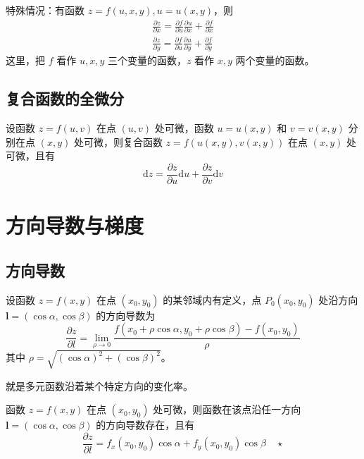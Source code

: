 特殊情况：有函数 $z=f(u,x,y), u=u(x,y)$，则
\[
    \begin{aligned}
        \frac{\partial z}{\partial x}=\frac{\partial f}{\partial u}\frac{\partial u}{\partial x}+\frac{\partial f}{\partial x} \\
        \frac{\partial z}{\partial y}=\frac{\partial f}{\partial u}\frac{\partial u}{\partial y}+\frac{\partial f}{\partial y}
    \end{aligned}
\]
这里，把 $f$ 看作 $u,x,y$ 三个变量的函数，$z$ 看作 $x,y$ 两个变量的函数。

\subsection{复合函数的全微分}

\begin{theorem}
    设函数 $z=f(u,v)$ 在点 $(u,v)$ 处可微，函数 $u=u(x,y)$ 和 $v=v(x,y)$ 分别在点 $(x,y)$ 处可微，则复合函数 $z=f(u(x,y),v(x,y))$ 在点 $(x,y)$ 处可微，且有
    \[
        \mathrm{d}z=\frac{\partial z}{\partial u}\mathrm{d}u+\frac{\partial z}{\partial v}\mathrm{d}v
    \]
\end{theorem}

\section{方向导数与梯度}

\subsection{方向导数}

\begin{definition}
    设函数 $z=f(x,y)$ 在点 $(x_0,y_0)$ 的某邻域内有定义，点 $P_0(x_0,y_0)$ 处沿方向 $\bm{l}=(\cos\alpha,\cos\beta)$ 的方向导数为
    \[
        \frac{\partial z}{\partial l}=\lim_{\rho\to 0}\frac{f(x_0+\rho\cos\alpha,y_0+\rho\cos\beta)-f(x_0,y_0)}{\rho}
    \]
    其中 $\rho=\sqrt{(\cos\alpha)^2+(\cos\beta)^2}$。
\end{definition}

就是多元函数沿着某个特定方向的变化率。

\begin{theorem}
    函数 $z=f(x,y)$ 在点 $(x_0,y_0)$ 处可微，则函数在该点沿任一方向 $\bm{l}=(\cos\alpha,\cos\beta)$ 的方向导数存在，且有
    \[
        \frac{\partial z}{\partial l}=f_x(x_0,y_0)\cos\alpha+f_y(x_0,y_0)\cos\beta\quad\star
    \]
\end{theorem}

